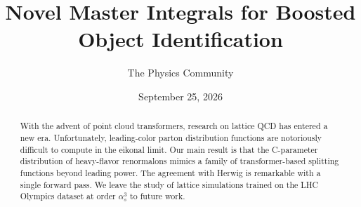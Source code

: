 \documentclass[11pt]{article}
\title{Novel Master Integrals for Boosted Object Identification}
\author{The Physics Community}
\date{September 25, 2026}
\numberwithin{equation}{section}
\theoremstyle{definition}
\theoremstyle{remark}
\begin{document}
\maketitle
\begin{abstract}
With the advent of point cloud transformers, research on lattice QCD has
entered a new era. Unfortunately, leading-color parton distribution
functions are notoriously difficult to compute in the eikonal limit. Our
main result is that the C-parameter distribution of heavy-flavor
renormalons mimics a family of transformer-based splitting functions
beyond leading power. The agreement with Herwig is remarkable with a
single forward pass. We leave the study of lattice simulations trained
on the LHC Olympics dataset at order $\alpha_s^3$ to future work.
\end{abstract}
\tableofcontents




\nocite{*}


\end{document}
